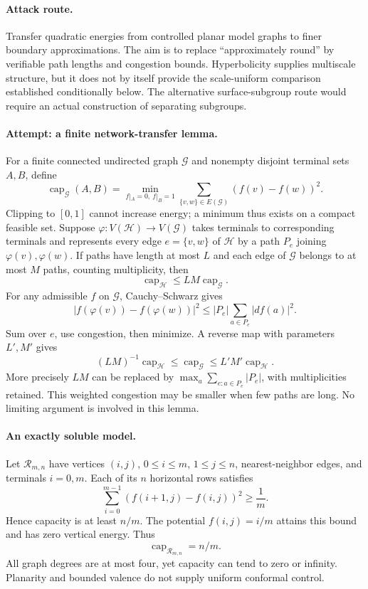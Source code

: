 \documentclass[11pt,a4paper]{article}
\numberwithin{equation}{section}
\begin{document}
\paragraph{Attack route.}
Transfer quadratic energies from controlled planar model graphs to finer
boundary approximations. The aim is to replace ``approximately round'' by
verifiable path lengths and congestion bounds. Hyperbolicity supplies
multiscale structure, but it does not by itself provide the scale-uniform
comparison established conditionally below. The alternative surface-subgroup
route would require an actual construction of separating subgroups.

\paragraph{Attempt: a finite network-transfer lemma.}
For a finite connected undirected graph $\mathcal G$ and nonempty disjoint
terminal sets $A,B$, define
\[
 \operatorname{cap}_{\mathcal G}(A,B)
 =\min_{f|_A=0,\ f|_B=1}\sum_{\{v,w\}\in E(\mathcal G)}(f(v)-f(w))^2.
\]
Clipping to $[0,1]$ cannot increase energy; a minimum thus exists on a compact
feasible set. Suppose $\varphi:V(\mathcal H)\to V(\mathcal G)$ takes
terminals to corresponding terminals and represents every edge
$e=\{v,w\}$ of $\mathcal H$ by a path $P_e$ joining $\varphi(v),\varphi(w)$.
If paths have length at most $L$ and each edge of $\mathcal G$ belongs to at
most $M$ paths, counting multiplicity, then
\begin{equation}\label{statement:transfer}
 \operatorname{cap}_{\mathcal H}\le LM\operatorname{cap}_{\mathcal G}.
\end{equation}
For any admissible $f$ on $\mathcal G$, Cauchy--Schwarz gives
\[
 |f(\varphi(v))-f(\varphi(w))|^2
 \le |P_e|\sum_{a\in P_e}|df(a)|^2.
\]
Sum over $e$, use congestion, then minimize. A reverse map with parameters
$L',M'$ gives
\[
 (LM)^{-1}\operatorname{cap}_{\mathcal H}
 \le\operatorname{cap}_{\mathcal G}
 \le L'M'\operatorname{cap}_{\mathcal H}.
\]
More precisely $LM$ can be replaced by
$\max_a\sum_{e:a\in P_e}|P_e|$, with multiplicities retained. This weighted
congestion may be smaller when few paths are long. No limiting argument is
involved in this lemma.

\paragraph{An exactly soluble model.}
Let $\mathcal R_{m,n}$ have vertices $(i,j)$, $0\le i\le m$, $1\le j\le n$,
nearest-neighbor edges, and terminals $i=0,m$. Each of its $n$ horizontal
rows satisfies
\[
 \sum_{i=0}^{m-1}(f(i+1,j)-f(i,j))^2\ge\frac1m.
\]
Hence capacity is at least $n/m$. The potential $f(i,j)=i/m$ attains this
bound and has zero vertical energy. Thus
\begin{equation}\label{statement:grid}
 \operatorname{cap}_{\mathcal R_{m,n}}=n/m.
\end{equation}
All graph degrees are at most four, yet capacity can tend to zero or
infinity. Planarity and bounded valence do not supply uniform conformal
control.
\end{document}
